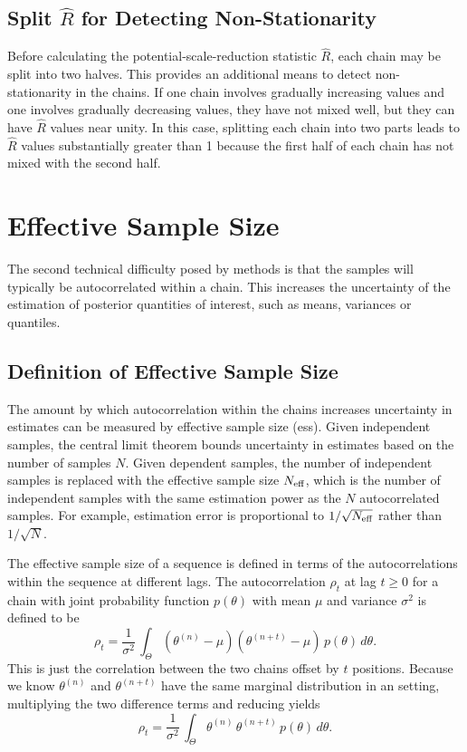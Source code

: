 \subsection{Split $\hat{R}$ for Detecting Non-Stationarity}

Before calculating the potential-scale-reduction statistic $\hat{R}$,
each chain may be split into two halves.  This provides an additional
means to detect non-stationarity in the chains.  If one chain involves
gradually increasing values and one involves gradually decreasing
values, they have not mixed well, but they can have $\hat{R}$ values
near unity.  In this case, splitting each chain into two parts leads
to $\hat{R}$ values substantially greater than 1 because the first
half of each chain has not mixed with the second half.  

\section{Effective Sample Size}\label{effective-sample-size.section}

The second technical difficulty posed by \MCMC methods is that the
samples will typically be autocorrelated within a chain.  This
increases the uncertainty of the estimation of posterior quantities of
interest, such as means, variances or quantiles.

\subsection{Definition of Effective Sample Size}

The amount by which autocorrelation within the chains increases
uncertainty in estimates can be measured by effective sample size
({\sc ess}).  Given independent samples, the central limit theorem
bounds uncertainty in estimates based on the number of samples $N$.
Given dependent samples, the number of independent samples is replaced
with the effective sample size $N_{\mbox{\scriptsize eff}}$, which is
the number of independent samples with the same estimation power as
the $N$ autocorrelated samples.  For example, estimation error is
proportional to $1/\sqrt{N_{\mbox{\scriptsize eff}}}$ rather than
$1/\sqrt{N}$.

The effective sample size of a sequence is defined in terms of the
autocorrelations within the sequence at different lags.  The
autocorrelation $\rho_t$ at lag $t \geq 0$ for a chain with joint
probability function $p(\theta)$ with mean $\mu$ and variance
$\sigma^2$ is defined to be
\[
\rho_t 
= 
\frac{1}{\sigma^2} \, \int_{\Theta} (\theta^{(n)} - \mu)
(\theta^{(n+t)} - \mu) \, p(\theta) \, d\theta.
\]
This is just the correlation between the two chains offset by $t$
positions.  Because we know $\theta^{(n)}$ and $\theta^{(n+t)}$ have
the same marginal distribution in an \MCMC setting, multiplying the
two difference terms and reducing yields
\[
\rho_t
= 
\frac{1}{\sigma^2} \, \int_{\Theta} \theta^{(n)} \, \theta^{(n+t)} \, p(\theta) \, d\theta.
\]

